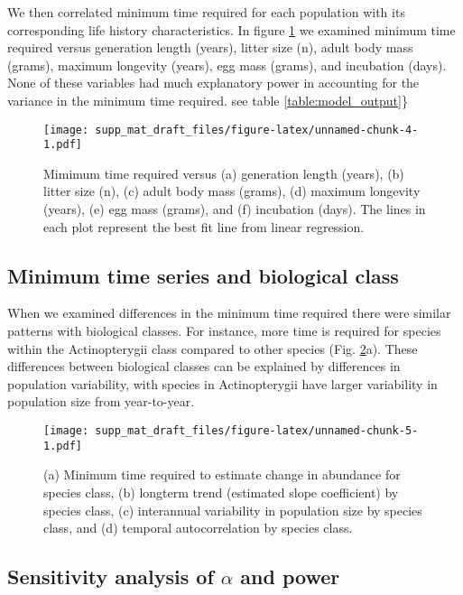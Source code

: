 \documentclass[12pt,]{article}
\begin{document}
We then correlated minimum time required for each population with its
corresponding life history characteristics. In figure
\ref{fig:biological_correlates} we examined minimum time required versus
generation length (years), litter size (n), adult body mass (grams),
maximum longevity (years), egg mass (grams), and incubation (days). None
of these variables had much explanatory power in accounting for the
variance in the minimum time required. see table
\ref{table:model_output}\}

\begin{figure}[htbp]
\centering
\texttt{[image: supp\_mat\_draft\_files/figure-latex/unnamed-chunk-4-1.pdf]}
\caption{Mimimum time required versus (a) generation length (years), (b)
litter size (n), (c) adult body mass (grams), (d) maximum longevity
(years), (e) egg mass (grams), and (f) incubation (days). The lines in
each plot represent the best fit line from linear
regression.\label{fig:biological_correlates}}
\end{figure}

\pagebreak

\subsection{Minimum time series and biological
class}\label{minimum-time-series-and-biological-class}

When we examined differences in the minimum time required there were
similar patterns with biological classes. For instance, more time is
required for species within the Actinopterygii class compared to other
species (Fig. \ref{fig:class}a). These differences between biological
classes can be explained by differences in population variability, with
species in Actinopterygii have larger variability in population size
from year-to-year.

\begin{figure}[htbp]
\centering
\texttt{[image: supp\_mat\_draft\_files/figure-latex/unnamed-chunk-5-1.pdf]}
\caption{(a) Minimum time required to estimate change in abundance for
species class, (b) longterm trend (estimated slope coefficient) by
species class, (c) interannual variability in population size by species
class, and (d) temporal autocorrelation by species
class.\label{fig:class}}
\end{figure}

\pagebreak

\subsection{\texorpdfstring{Sensitivity analysis of \(\alpha\) and
power}{Sensitivity analysis of \textbackslash{}alpha and power}}\label{sensitivity-analysis-of-alpha-and-power}
\end{document}
